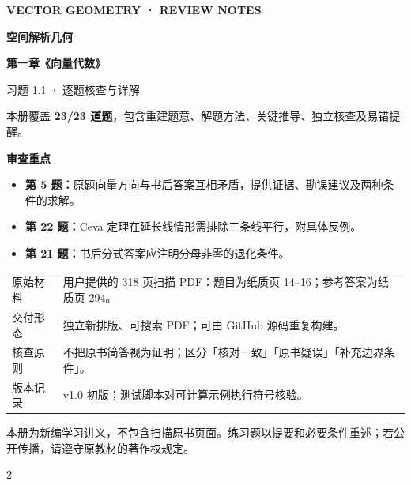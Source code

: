 \documentclass[UTF8,a4paper,10.5pt,fontset=none]{ctexart}
\begin{document}
\thispagestyle{empty}
\vspace*{18mm}
{\sffamily\large\color{teal}\bfseries VECTOR GEOMETRY · REVIEW NOTES}\par
\vspace{7mm}
{\sffamily\fontsize{28}{37}\selectfont\bfseries\color{navy} 空间解析几何\par}
\vspace{3mm}
{\sffamily\fontsize{21}{31}\selectfont\bfseries\color{navy} 第一章《向量代数》\par}
\vspace{2mm}
{\sffamily\fontsize{20}{28}\selectfont\color{blue} 习题 1.1 · 逐题核查与详解\par}
\vspace{14mm}
\begin{tcolorbox}[colback=light,colframe=rulegray,arc=2mm,boxrule=0.6pt,left=5mm,right=5mm,top=5mm,bottom=5mm]
\large 本册覆盖 \textbf{23/23 道题}，包含重建题意、解题方法、关键推导、独立核查及易错提醒。\par\medskip
\normalsize
\textbf{审查重点}\par
\begin{itemize}
\item \textbf{第 5 题：}原题向量方向与书后答案互相矛盾，提供证据、勘误建议及两种条件的求解。
\item \textbf{第 22 题：}Ceva 定理在延长线情形需排除三条线平行，附具体反例。
\item \textbf{第 21 题：}书后分式答案应注明分母非零的退化条件。
\end{itemize}
\end{tcolorbox}
\vfill
\noindent\begin{tabularx}{\linewidth}{@{}lX@{}}
\toprule
原始材料 & 用户提供的 318 页扫描 PDF：题目为纸质页 14--16；参考答案为纸质页 294。\\
交付形态 & 独立新排版、可搜索 PDF；可由 GitHub 源码重复构建。\\
核查原则 & 不把原书简答视为证明；区分「核对一致」「原书疑误」「补充边界条件」。\\
版本记录 & v1.0 初版；测试脚本对可计算示例执行符号核验。\\
\bottomrule
\end{tabularx}
\vspace{8mm}
{\footnotesize\color{gray} 本册为新编学习讲义，不包含扫描原书页面。练习题以提要和必要条件重述；若公开传播，请遵守原教材的著作权规定。}\par
\newpage
\begin{multicols}{2}
\small
\tableofcontents
\end{multicols}
\newpage
\end{document}
